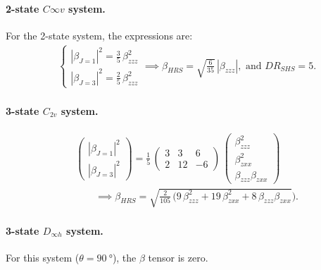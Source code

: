 \documentclass[journal=jpcafh]{achemso}
\begin{document}
\paragraph{2-state $C{\infty v}$ system.} For the 2-state system, the expressions are:\begin{align}
	&\begin{cases}
		|\beta_{J=1}|^2=\frac{3}{5}\,\beta_{zzz}^2\\
		 |\beta_{J=3}|^2=\frac{2}{5}\,\beta_{zzz}^2
	\end{cases} \implies \beta_{HRS} = \sqrt{\frac{6}{35}}\,|\beta_{zzz}|,  \text{ and } DR_{SHS} = 5.
\end{align}


\paragraph{3-state $C_{2v}$ system.}\begin{align}
	&\begin{pmatrix}
		|\beta_{J=1}|^2 \\ |\beta_{J=3}|^2
	\end{pmatrix} = \frac{1}{5}\,\begin{pmatrix}
	3 & 3 & 6 \\
	2 & 12 & -6
	\end{pmatrix}\,\begin{pmatrix}
	\beta_{zzz}^2\\\beta_{zxx}^2\\\beta_{zzz}\beta_{zxx}
	\end{pmatrix}\nonumber\\
	&\hspace{2em}\implies \beta_{HRS} = \sqrt{\frac{2}{105}\,(9\,\beta_{zzz}^2+19\,\beta_{zxx}^2+8\,\beta_{zzz}\beta_{zxx}}).
\end{align}


\paragraph{3-state $D_{\infty h}$ system.} For this system ($\theta = \SI{90}{\degree}$), the $\beta$ tensor is zero. 
\end{document}
